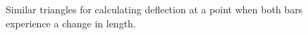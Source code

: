 \documentclass[
  letterpaper,
  DIV=11,
  numbers=noendperiod]{scrreprt}
\theoremstyle{definition}
\theoremstyle{remark}
\begin{document}
\begin{figure}


\caption{\label{fig-5.9}Similar triangles for calculating deflection at
a point when both bars experience a change in length.}

\end{figure}%
\end{document}
